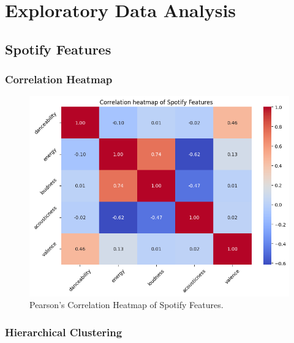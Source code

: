 \chapter{Exploratory Data Analysis}
\label{cha:eda}


\section{Spotify Features}
\label{sec:spotifyfeatures}

\subsection*{Correlation Heatmap}
\label{sec:correlationheatmapsspotifyfeatures}

\begin{center}
\begin{figure}[H]
  \centering
  \includegraphics[width=6in]{img/corr_heatmap_spotify_features.png}
  \caption{Pearson's Correlation Heatmap of Spotify Features.}
  \label{Figure:corr_heatmap_spotify_features}
\end{figure}
\end{center}

\subsection*{Hierarchical Clustering}
\label{sec:hierarchicalclustering}

